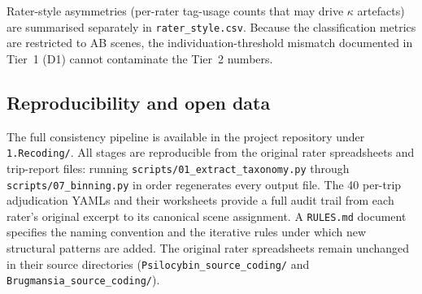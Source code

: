 Rater-style asymmetries (per-rater tag-usage counts that may drive $\kappa$ artefacts) are summarised separately in \texttt{rater\_style.csv}. Because the classification metrics are restricted to AB scenes, the individuation-threshold mismatch documented in Tier~1 (D1) cannot contaminate the Tier~2 numbers.

\subsection{Reproducibility and open data}
\label{sec:reproducibility}

The full consistency pipeline is available in the project repository under \texttt{1.Recoding/}. All stages are reproducible from the original rater spreadsheets and trip-report files: running \texttt{scripts/01\_extract\_taxonomy.py} through \texttt{scripts/07\_binning.py} in order regenerates every output file. The 40 per-trip adjudication YAMLs and their worksheets provide a full audit trail from each rater's original excerpt to its canonical scene assignment. A \texttt{RULES.md} document specifies the naming convention and the iterative rules under which new structural patterns are added. The original rater spreadsheets remain unchanged in their source directories (\texttt{Psilocybin\_source\_coding/} and \texttt{Brugmansia\_source\_coding/}).
